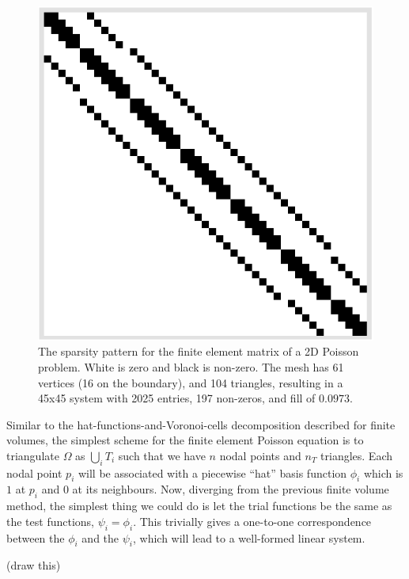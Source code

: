 \begin{figure}[H]
    \begin{center}
        \includegraphics[width=0.26\linewidth]{figures/sparsity_pattern_no_text.png}
    \end{center}
    \caption{\scriptsize
        The sparsity pattern for the finite element matrix of a 2D Poisson problem. White is zero and black is non-zero.
        The mesh has 61 vertices (16 on the boundary), and 104 triangles, resulting in a 45x45 system with 2025 entries, 197 non-zeros, and fill of $0.0973$.
    }
    \label{sparsity_pattern}
\end{figure}


Similar to the hat-functions-and-Voronoi-cells decomposition described for finite volumes,
the simplest scheme for the finite element Poisson equation is to triangulate $\Omega$ as
    $\bigcup_i T_i$
such that we have $n$ nodal points and $n_T$ triangles.
Each nodal point $p_i$ will be associated with a piecewise ``hat'' basis function $\phi_i$ which is $1$ at $p_i$ and
$0$ at its neighbours. Now, diverging from the previous finite volume method, the simplest thing we could do is let the trial functions be the same
as the test functions, $\psi_i = \phi_i$. This trivially gives a one-to-one correspondence between the $\phi_i$ and the $\psi_i$, which will lead
to a well-formed linear system.

\vskip 0.1in
(draw this)
\vskip 0.1in



